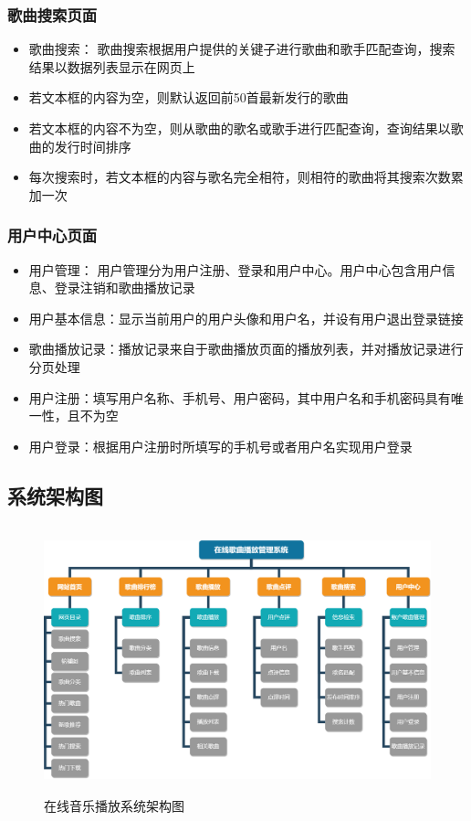 \documentclass[UTF8,14pt]{article}
\numberwithin{figure}{subsubsection}
\numberwithin{table}{subsubsection}
\begin{document}
\subsubsection{歌曲搜索页面}
\begin{itemize}
	\setlength{\itemsep}{0pt}
	      \setlength{\parsep}{0pt}
	      \setlength{\parskip}{0pt}
	\item 歌曲搜索：
	      歌曲搜索根据用户提供的关键子进行歌曲和歌手匹配查询，搜索结果以数据列表显示在网页上
	\item 若文本框的内容为空，则默认返回前50首最新发行的歌曲
	\item 若文本框的内容不为空，则从歌曲的歌名或歌手进行匹配查询，查询结果以歌曲的发行时间排序
	\item 每次搜索时，若文本框的内容与歌名完全相符，则相符的歌曲将其搜索次数累加一次
\end{itemize}
\vspace*{-0.3cm}
\subsubsection{用户中心页面}
\begin{itemize}
	\setlength{\itemsep}{0pt}
	      \setlength{\parsep}{0pt}
	      \setlength{\parskip}{0pt}
	\item 用户管理：
	      用户管理分为用户注册、登录和用户中心。用户中心包含用户信息、登录注销和歌曲播放记录
	\item 用户基本信息：显示当前用户的用户头像和用户名，并设有用户退出登录链接
	\item 歌曲播放记录：播放记录来自于歌曲播放页面的播放列表，并对播放记录进行分页处理
	\item 用户注册：填写用户名称、手机号、用户密码，其中用户名和手机密码具有唯一性，且不为空
	\item 用户登录：根据用户注册时所填写的手机号或者用户名实现用户登录
\end{itemize}


\subsection{系统架构图}
\vspace*{-0.5cm}
\begin{figure}[H]
	\centering
	\includegraphics[width=12.58cm,height=7.76cm]{figures/2.png}
	\caption{在线音乐播放系统架构图}
\end{figure}
\vspace*{-1cm}
\end{document}
